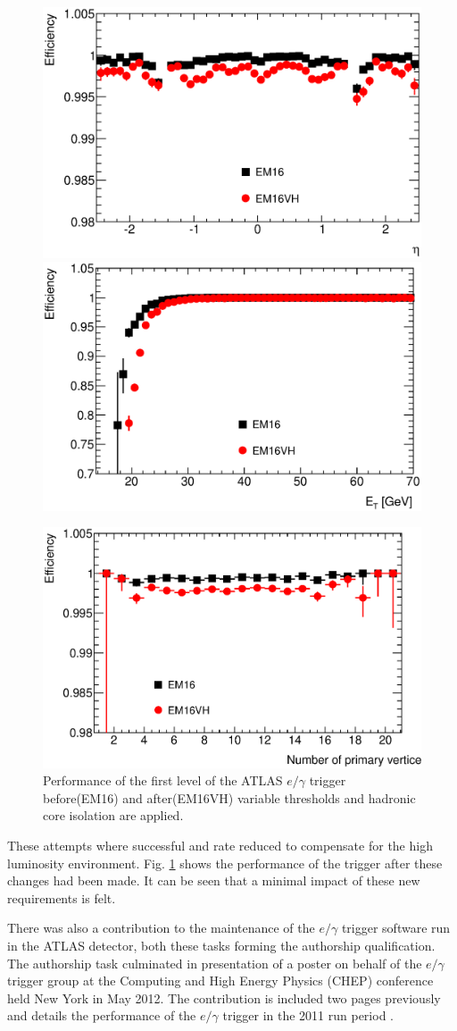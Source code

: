 	\begin{figure}[h!]
		\centering
			\includegraphics[width=0.49\linewidth]{images/L1_EM16VH_TandP_eff_vs_eta.eps}
			\includegraphics[width=0.49\linewidth]{images/L1_EM16VH_TandP_eff_vs_Et.eps}

			\includegraphics[width=0.49\linewidth]{images/L1_EM16VH_TandP_eff_vs_pvx.eps}
		\caption{Performance of the first level of the ATLAS $e/\gamma$ trigger before(EM16) and after(EM16VH) variable thresholds and hadronic core isolation are applied.}
		\label{fig:L1}
	\end{figure}

	These attempts where successful and rate reduced to compensate for the high luminosity environment. Fig. \ref{fig:L1} shows the performance of the trigger after these changes had been made. It can be seen that a minimal impact of these new requirements is felt.


	There was also a contribution to the maintenance of the $e/\gamma$ trigger software run in the ATLAS detector, both these tasks forming the authorship qualification. The authorship task culminated in presentation of a poster on behalf of the $e/\gamma$ trigger group at the Computing and High Energy Physics (CHEP) conference held New York in May 2012. The contribution is included two pages previously and details the performance of the $e/\gamma$ trigger in the 2011 run period \cite{poster}.

